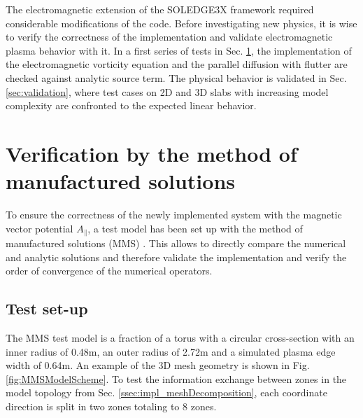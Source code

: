 \newpage




The electromagnetic extension of the SOLEDGE3X framework required considerable modifications of the code. Before investigating new physics, it is wise to verify the correctness of the implementation and validate electromagnetic plasma behavior with it. In a first series of tests in Sec. \ref{sec:verification}, the implementation of the electromagnetic vorticity equation and the parallel diffusion with flutter are checked against analytic source term. The physical behavior is validated in Sec. \ref{sec:validation}, where test cases on 2D and 3D slabs with increasing model complexity are confronted to the expected linear behavior.


\section{Verification by the method of manufactured solutions}
\label{sec:verification}
To ensure the correctness of the newly implemented system with the magnetic vector potential $A_\parallel$, a test model has been set up with the method of manufactured solutions (MMS) \cite{ManufacturedSolution}. This allows to directly compare the numerical and analytic solutions and therefore validate the implementation and verify the order of convergence of the numerical operators. 

\subsection{Test set-up}
The MMS test model is a fraction of a torus with a circular cross-section with an inner radius of 0.48m, an outer radius of 2.72m and a simulated plasma edge width of 0.64m. An example of the 3D mesh geometry is shown in Fig. \ref{fig:MMSModelScheme}. To test the information exchange between zones in the model topology from Sec. \ref{ssec:impl_meshDecomposition}, each coordinate direction is split in two zones totaling to 8 zones.

